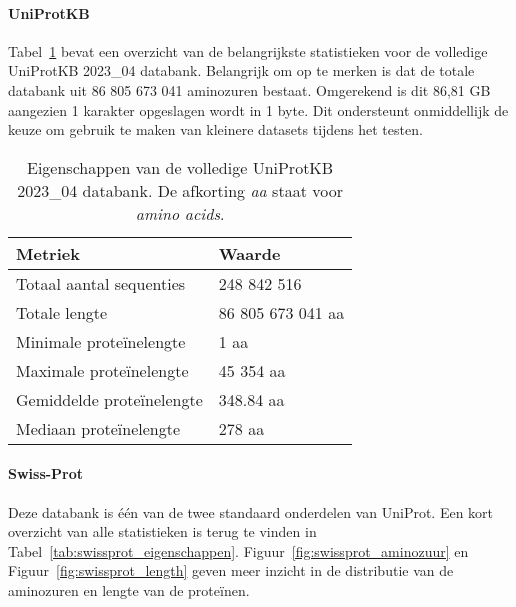 \paragraph{UniProtKB}
Tabel~\ref{tab:uniprotKB_eigenschappen} bevat een overzicht van de belangrijkste statistieken voor de volledige UniProtKB 2023\_04 databank.
Belangrijk om op te merken is dat de totale databank uit 86 805 673 041 aminozuren bestaat.
Omgerekend is dit 86,81 GB aangezien 1 karakter opgeslagen wordt in 1 byte.
Dit ondersteunt onmiddellijk de keuze om gebruik te maken van kleinere datasets tijdens het testen.

\begin{table}[h!]
    \centering
    \begin{tabular}{ l l }
        Metriek                   & Waarde            \\
        \hline\hline
        Totaal aantal sequenties  & 248 842 516       \\
        Totale lengte             & 86 805 673 041 aa \\
        Minimale proteïnelengte   & 1 aa              \\
        Maximale proteïnelengte   & 45 354 aa         \\
        Gemiddelde proteïnelengte & 348.84 aa         \\
        Mediaan proteïnelengte    & 278 aa            \\
        \hline
    \end{tabular}
    \caption{Eigenschappen van de volledige UniProtKB 2023\_04 databank. De afkorting \textit{aa} staat voor \textit{amino acids}.}
    \label{tab:uniprotKB_eigenschappen}
\end{table}

\paragraph{Swiss-Prot} Deze databank is één van de twee standaard onderdelen van UniProt.
Een kort overzicht van alle statistieken is terug te vinden in Tabel~\ref{tab:swissprot_eigenschappen}.
Figuur~\ref{fig:swissprot_aminozuur} en Figuur~\ref{fig:swissprot_length} geven meer inzicht in de distributie van de aminozuren en lengte van de proteïnen.


